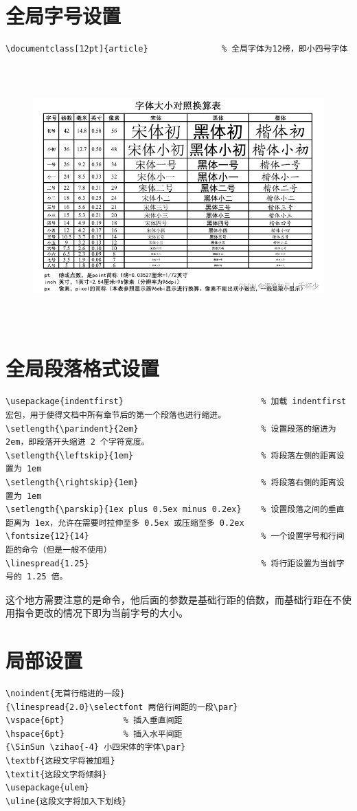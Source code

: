 \section{全局字号设置}
\begin{lstlisting}[style = LaTeX_TeXworks,numbers=none]
\documentclass[12pt]{article}				% 全局字体为12榜，即小四号字体
\end{lstlisting}
\begin{figure}[H]
	\centering
	\includegraphics[height = 10cm, width = 15cm]{figure/字号对照表.png}		%
\end{figure}
\section{全局段落格式设置}
\begin{lstlisting}[style = LaTeX_TeXworks]
\usepackage{indentfirst}							% 加载 indentfirst 宏包，用于使得文档中所有章节后的第一个段落也进行缩进。
\setlength{\parindent}{2em}							% 设置段落的缩进为 2em，即段落开头缩进 2 个字符宽度。
\setlength{\leftskip}{1em}							% 将段落左侧的距离设置为 1em
\setlength{\rightskip}{1em}							% 将段落右侧的距离设置为 1em
\setlength{\parskip}{1ex plus 0.5ex minus 0.2ex}	% 设置段落之间的垂直距离为 1ex，允许在需要时拉伸至多 0.5ex 或压缩至多 0.2ex
\fontsize{12}{14}									% 一个设置字号和行间距的命令（但是一般不使用）
\linespread{1.25}									% 将行距设置为当前字号的 1.25 倍。
\end{lstlisting}
这个地方需要注意的是命令，他后面的参数是基础行距的倍数，而基础行距在不使用指令更改的情况下即为当前字号的大小。
\section{局部设置}
\begin{lstlisting}[style = LaTeX_TeXworks]
\noindent{无首行缩进的一段}
{\linespread{2.0}\selectfont 两倍行间距的一段\par}
\vspace{6pt}			% 插入垂直间距
\hspace{6pt}			% 插入水平间距
{\SinSun \zihao{-4} 小四宋体的字体\par}
\textbf{这段文字将被加粗}
\textit{这段文字将倾斜}
\usepackage{ulem}
\uline{这段文字将加入下划线}
\end{lstlisting}
